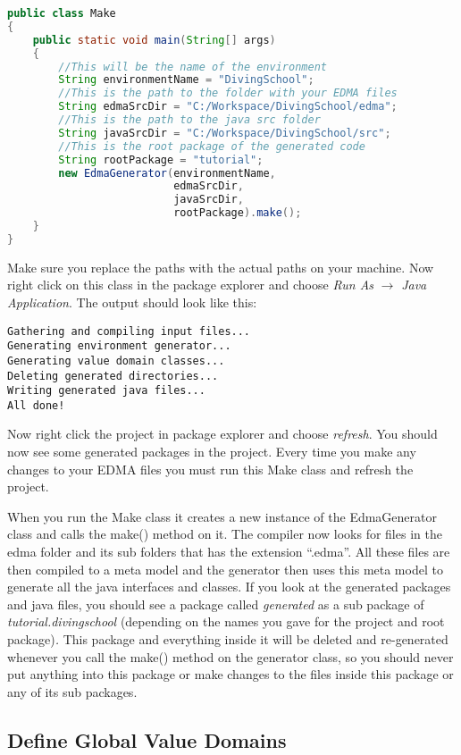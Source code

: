 \begin{enumerate}
\begin{lstlisting}[basicstyle={\scriptsize},breaklines=true,language=Java,tabsize=2]
public class Make
{
	public static void main(String[] args)
	{
		//This will be the name of the environment
		String environmentName = "DivingSchool";
		//This is the path to the folder with your EDMA files
		String edmaSrcDir = "C:/Workspace/DivingSchool/edma";
		//This is the path to the java src folder
		String javaSrcDir = "C:/Workspace/DivingSchool/src";
		//This is the root package of the generated code
		String rootPackage = "tutorial";
		new EdmaGenerator(environmentName,
						  edmaSrcDir,
						  javaSrcDir,
						  rootPackage).make();
	}
}
\end{lstlisting}
Make sure you replace the paths with the actual paths on your machine.
Now right click on this class in the package explorer and choose \emph{Run
As} \(\rightarrow\) \emph{Java Application}. The output should look
like this: 
\begin{lstlisting}[basicstyle={\scriptsize}]
Gathering and compiling input files...
Generating environment generator...
Generating value domain classes...
Deleting generated directories...
Writing generated java files...
All done!
\end{lstlisting}
Now right click the project in package explorer and choose \emph{refresh}.
You should now see some generated packages in the project. Every time
you make any changes to your EDMA files you must run this Make class
and refresh the project.
\end{enumerate}
When you run the Make class it creates a new instance of the EdmaGenerator
class and calls the make() method on it. The compiler now looks for
files in the edma folder and its sub folders that has the extension
``.edma''. All these files are then compiled to a meta model and
the generator then uses this meta model to generate all the java interfaces
and classes. If you look at the generated packages and java files,
you should see a package called \emph{generated} as a sub package
of\emph{ tutorial.divingschool }(depending on the names you gave for
the project and root package)\emph{.} This package and everything
inside it will be deleted and re-generated whenever you call the make()
method on the generator class, so you should never put anything into
this package or make changes to the files inside this package or any
of its sub packages.


\subsection{Define Global Value Domains}


